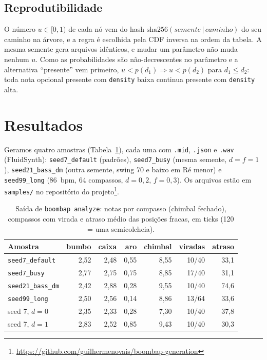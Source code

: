 \documentclass{article}
\newcommand{\repourl}{\url{https://github.com/guilhermenovais/boombap-generation}}
\newcommand{\tm}[1]{\texttt{#1}}
\begin{document}
\subsection{Reprodutibilidade}

O número $u\in[0,1)$ de cada nó vem do hash
$\textrm{sha256}(\textit{semente}\,|\,\textit{caminho})$ do seu caminho na árvore, e a regra é escolhida pela CDF inversa na ordem da tabela. A mesma semente gera arquivos
idênticos, e mudar um parâmetro não muda nenhum $u$. Como as probabilidades são não-decrescentes no parâmetro e a alternativa ``presente'' vem
primeiro, $u<p(d_1)\Rightarrow u<p(d_2)$ para $d_1\le d_2$: toda nota opcional presente com
\tm{density} baixa continua presente com \tm{density} alta.

\section{Resultados}\label{sec:results}

Geramos quatro amostras (Tabela~\ref{tab:results}), cada uma com \tm{.mid}, \tm{.json} e \tm{.wav}
(FluidSynth): \tm{seed7\_default} (padrões),
\tm{seed7\_busy} (mesma semente, $d=f=1$), \tm{seed21\_bass\_dm} (outra semente, swing 70 e baixo em
Ré menor) e \tm{seed99\_long} (86~bpm, 64 compassos, $d=0{,}2$, $f=0{,}3$). Os arquivos estão em
\tm{samples/} no repositório do projeto\footnote{\repourl}.

\begin{table}[t]
\footnotesize
\centering
\setlength{\tabcolsep}{3.4pt}
\begin{tabular}{@{}lrrrrrr@{}}
\toprule
Amostra & bumbo & caixa & aro & chimbal & viradas & atraso \\
\midrule
\tm{seed7\_default} & 2,52 & 2,48 & 0,55 & 8,55 & 10/40 & 33,1 \\
\tm{seed7\_busy} & 2,77 & 2,75 & 0,75 & 8,85 & 17/40 & 31,1 \\
\tm{seed21\_bass\_dm} & 2,42 & 2,88 & 0,28 & 9,55 & 10/40 & 74,6 \\
\tm{seed99\_long} & 2,50 & 2,56 & 0,14 & 8,86 & 13/64 & 33,6 \\
\midrule
seed 7, $d=0$ & 2,35 & 2,33 & 0,28 & 7,30 & 10/40 & 37,8 \\
seed 7, $d=1$ & 2,83 & 2,52 & 0,85 & 9,43 & 10/40 & 30,3 \\
\bottomrule
\end{tabular}
\caption{Saída de \tm{boombap analyze}: notas por compasso (chimbal fechado), compassos com virada e
atraso médio das posições fracas, em ticks (120 = uma semicolcheia).}
\label{tab:results}
\end{table}
\end{document}
